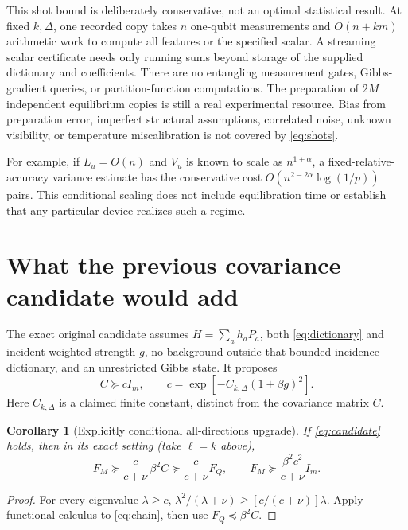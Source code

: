 \documentclass[11pt,a4paper]{article}
\newtheorem{corollary}[theorem]{Corollary}
\theoremstyle{remark}
\begin{document}
This shot bound is deliberately conservative, not an optimal statistical result. At fixed $k,\Delta$, one recorded copy takes $n$ one-qubit measurements and $O(n+km)$ arithmetic work to compute all features or the specified scalar. A streaming scalar certificate needs only running sums beyond storage of the supplied dictionary and coefficients. There are no entangling measurement gates, Gibbs-gradient queries, or partition-function computations. The preparation of $2M$ independent equilibrium copies is still a real experimental resource. Bias from preparation error, imperfect structural assumptions, correlated noise, unknown visibility, or temperature miscalibration is not covered by \eqref{eq:shots}.

For example, if $L_u=O(n)$ and $V_u$ is known to scale as $n^{1+\alpha}$, a fixed-relative-accuracy variance estimate has the conservative cost $O(n^{2-2\alpha}\log(1/p))$ pairs. This conditional scaling does not include equilibration time or establish that any particular device realizes such a regime.

\section{What the previous covariance candidate would add}

The exact original candidate assumes $H=\sum_a h_aP_a$, both \eqref{eq:dictionary} and incident weighted strength $g$, no background outside that bounded-incidence dictionary, and an unrestricted Gibbs state. It proposes
\begin{equation}
 C\succeq c I_m,\qquad c=\exp[-C_{k,\Delta}(1+\beta g)^2].
 \label{eq:candidate}
\end{equation}
Here $C_{k,\Delta}$ is a claimed finite constant, distinct from the covariance matrix $C$.

\begin{corollary}[Explicitly conditional all-directions upgrade]\label{cor:conditional}
\emph{If} \eqref{eq:candidate} holds, then in its exact setting (take $\ell=k$ above),
\begin{equation}
 F_M\succeq\frac{c}{c+\nu}\,\beta^2C
 \succeq\frac{c}{c+\nu}F_Q,
 \qquad
 F_M\succeq\frac{\beta^2c^2}{c+\nu}I_m.
 \label{eq:conditional}
\end{equation}
\end{corollary}
\begin{proof}
For every eigenvalue $\lambda\ge c$, $\lambda^2/(\lambda+\nu)\ge[c/(c+\nu)]\lambda$. Apply functional calculus to \eqref{eq:chain}, then use $F_Q\preceq\beta^2C$.
\end{proof}
\end{document}
